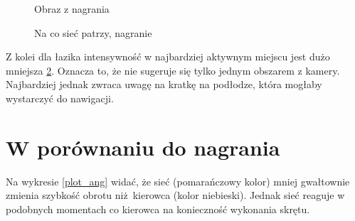 \begin{figure}
  \centering
  \caption{Obraz z nagrania}
  \label{real_img}
\end{figure}
\begin{figure}
  \centering
  \caption{Na co sieć patrzy, nagranie}
  \label{real_act}
\end{figure}

Z kolei dla łazika intensywność w najbardziej aktywnym miejscu jest dużo mniejsza \ref{real_act}.
Oznacza to, że nie sugeruje się tylko jednym obszarem z kamery. Najbardziej jednak 
zwraca uwagę na kratkę na podłodze, która mogłaby wystarczyć do nawigacji.

\section{W porównaniu do nagrania}
Na wykresie \ref{plot_ang} widać, że sieć (pomarańczowy kolor) mniej gwałtownie 
zmienia szybkość obrotu niż kierowca (kolor niebieski). Jednak sieć reaguje w podobnych momentach co kierowca na konieczność wykonania skrętu.

